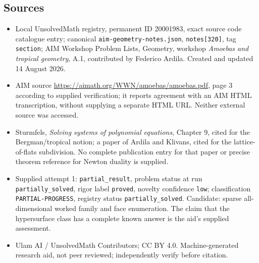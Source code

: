 \documentclass[11pt]{article}
\begin{document}
\subsection{Sources}
\begin{itemize}
\item Local UnsolvedMath registry, permanent ID 20001983, exact source code catalogue entry; canonical \texttt{aim-geometry-notes.json}, \texttt{notes[320]}, tag \texttt{section}; AIM Workshop Problem Lists, Geometry, workshop \emph{Amoebas and tropical geometry}, A.1, contributed by Federico Ardila. Created and updated 14 August 2026.
\item AIM source \url{https://aimath.org/WWN/amoebas/amoebas.pdf}, page 3 according to supplied verification; it reports agreement with an AIM HTML transcription, without supplying a separate HTML URL. Neither external source was accessed.
\item Sturmfels, \emph{Solving systems of polynomial equations}, Chapter 9, cited for the Bergman/tropical notion; a paper of Ardila and Klivans, cited for the lattice-of-flats subdivision. No complete publication entry for that paper or precise theorem reference for Newton duality is supplied.
\item Supplied attempt 1: \texttt{partial\_result}, problem status at run \texttt{partially\_solved}, rigor label \texttt{proved}, novelty confidence \texttt{low}; classification \texttt{PARTIAL-PROGRESS}, registry status \texttt{partially\_solved}. Candidate: sparse all-dimensional worked family and face enumeration. The claim that the hypersurface class has a complete known answer is the aid's supplied assessment.
\item Ulam AI / UnsolvedMath Contributors; CC BY 4.0. Machine-generated research aid, not peer reviewed; independently verify before citation.
\end{itemize}
\end{document}
